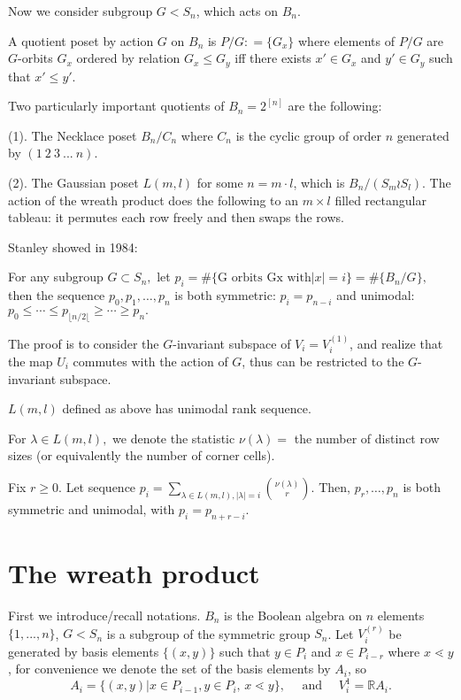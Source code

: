 \documentclass[12pt]{article}
\newcommand{\1}{\mathbb{I}}
\newcommand{\R}{\mathbb{R}}
\theoremstyle{definition}
\theoremstyle{definition}
\theoremstyle{definition}
\theoremstyle{definition}
\theoremstyle{definition}
\theoremstyle{definition}
\begin{document}
Now we consider subgroup $G < S_n$, which acts on $B_n$. 

 A quotient poset by action $G$ on $B_n$ is $P/G : = \{G_x\}$ where elements of $P/G$ are $G$-orbits $G_x$ ordered by relation $G_x \le G_y$ iff there exists $ x' \in G_x$ and $y' \in G_y$ such that $x' \le y'$. 

Two particularly important quotients of $B_n = 2^{[n]}$ are the following: 

(1). The Necklace poset $B_n/C_n$ where $C_n$ is the cyclic group of order $n$ generated by $(1 \: 2 \: 3 \: ... \: n)$.

(2). The Gaussian poset $L(m,l)$ for some $n = m \cdot l$, which is $B_n / (S_m \wr S_l)$. The action of the wreath product does the following to an $m \times l $ filled rectangular tableau: it permutes each row freely and then swaps the rows.  

Stanley showed in 1984: 

\theorem[Stanley, 1984] For any subgroup $G \subset S_n,$ 
let $p_i = \# \{\text{G orbits Gx with} |x| = i\} = \#
\{B_n/G\},$ then the sequence $p_0,p_1,\ldots, p_n$ is both symmetric: $p_i = p_{n-i}$ and unimodal: $p_0 \le \cdots \le p_{\lfloor n/2 \lfloor} \ge \cdots \ge p_n.$

\proof The proof is to consider the $G$-invariant subspace of $V_i = V_i^{(1)}$, and realize that the map $U_i$ commutes with the action of $G$, thus can be restricted to the $G$-invariant subspace. 

\corollary[Sylvester, 1878] $L(m,l)$ defined as above has unimodal rank sequence. 


  For $\lambda \in L(m,l),$ we denote the statistic $\nu(\lambda) =$ the number of distinct row sizes (or equivalently the number of corner cells).


 Fix $r \geq 0.$ Let sequence $p_i = \sum_{\lambda \in L(m,l),|\lambda | = i}^{}\binom {\nu(\lambda)}r.$ Then, $p_r,\ldots, p_n$ is both symmetric and unimodal, with $p_i =p_{n+r - i}.$



\newpage
\section{The wreath product} \indent 

First we introduce/recall notations. $B_n$ is the Boolean algebra on $n$ elements $\{1, ..., n\}$, $G < S_n$ is a subgroup of the symmetric group $S_n$.  Let $V_i^{(r)}$ be generated by basis elements $\{{(x,y)}\}$ such that $y \in P_i$ and $x \in P_{i -r}$ where $x \lessdot y$, for convenience we denote the set of the basis elements by $A_i$, so $$A_i = \{ (x, y) | x \in P_{i-1}, y \in P_i,  \, x \lessdot y \}, \quad \text{ and } \quad  V_i^{1} = \R A_i.$$
\end{document}
